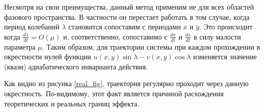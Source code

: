 Несмотря на свои преимущества, данный метод применим не для всех областей фазового пространства. В частности он перестает работать в том случае, когда период колебаний $\lambda$ становится сопоставим с периодами $\overline x$ и $\overline y$. Это происходит когда $\frac{d \lambda}{dt} = O(\mu)$ и, соответственно, сопоставимо с $\frac{dx}{dt}$ и $\frac{dx}{dt}$ в силу малости параметра $\mu$. Таким образом, для траектории системы при каждом прохождении в окрестности нулей функции $u(x,y)\sin \lambda - v(x,y) \cos \lambda$ изменяется значение (квази) адиабатического инварианта действия.

Как видно из рисунка \ref{real_fig}, траектория регулярно проходит через данную окрестность. По-видимому, этот факт является причиной расхождения теоретических и реальных границ эффекта.
